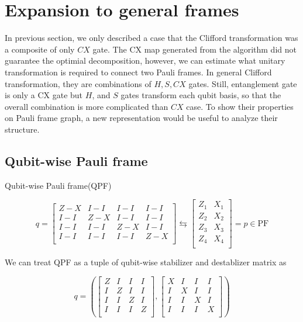 \documentclass[a4paper,12pt]{article}
\begin{document}
\section{Expansion to general frames}

In previous section, we only described a case that the Clifford transformation
was a composite of only $CX$ gate.
The CX map generated from the algorithm did not guarantee the optimial 
decomposition, however, we can estimate what unitary transformation is required 
to connect two Pauli frames.
In general Clifford transformation, they are combinations of $H ,S, CX$ gates.
Still, entanglement gate is only a CX gate but $H$, and $S$ gates
transform each qubit basis, so that the overall combination is more complicated than 
$CX$ case.
To show their properties on Pauli frame graph,
a new representation would be useful to analyze 
their structure.

\subsection{Qubit-wise Pauli frame}

Qubit-wise Pauli frame(QPF)


\begin{equation}
    q = \begin{bmatrix}
        Z-X & I-I & I-I & I-I \\
        I-I & Z-X & I-I & I-I \\
        I-I & I-I & Z-X & I-I \\
        I-I & I-I & I-I & Z-X \\
    \end{bmatrix} \leftrightarrows
    \begin{bmatrix}
        Z_1 & X_1\\
        Z_2 & X_2\\
        Z_3 & X_3\\
        Z_4 & X_4\\
    \end{bmatrix} = p \in \mbox{PF}
\end{equation}

We can treat QPF as a tuple of qubit-wise stabilizer and destablizer matrix as 

\begin{equation}
    q = \left( 
        \begin{bmatrix}
        Z & I & I & I \\
        I & Z & I & I \\
        I & I & Z & I \\
        I & I & I & Z \\
        \end{bmatrix},
        \begin{bmatrix}
        X & I & I & I \\
        I & X & I & I \\
        I & I & X & I \\
        I & I & I & X \\
        \end{bmatrix}
    \right)
\end{equation}
\end{document}
